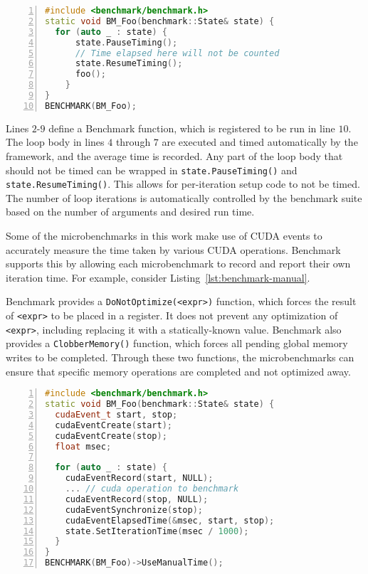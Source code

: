 \begin{minipage}{\linewidth}
\begin{lstlisting}[language=C++, caption=Benchmark with automatic timing., label=lst:benchmark-automatic, numbers=left]
#include <benchmark/benchmark.h>
static void BM_Foo(benchmark::State& state) {
  for (auto _ : state) {
	  state.PauseTiming();
	  // Time elapsed here will not be counted
	  state.ResumeTiming();
	  foo();
	}
}
BENCHMARK(BM_Foo);
\end{lstlisting}
\end{minipage}

Lines $2$-$9$ define a Benchmark function, which is registered to be run in line $10$.
The loop body in lines $4$ through $7$ are executed and timed automatically by the framework, and the average time is recorded.
Any part of the loop body that should not be timed can be wrapped in \texttt{state.PauseTiming()} and \texttt{state.ResumeTiming()}.
This allows for per-iteration setup code to not be timed.
The number of loop iterations is automatically controlled by the benchmark suite based on the number of arguments and desired run time.

Some of the microbenchmarks in this work make use of CUDA events to accurately measure the time taken by various CUDA operations.
Benchmark supports this by allowing each microbenchmark to record and report their own iteration time.
For example, consider Listing~\ref{lst:benchmark-manual}.

Benchmark provides a \texttt{DoNotOptimize(<expr>)} function, which forces the result of \texttt{<expr>} to be placed in a register.
It does not prevent any optimization of \texttt{<expr>}, including replacing it with a statically-known value.
Benchmark also provides a \texttt{ClobberMemory()} function, which forces all pending global memory writes to be completed.
Through these two functions, the microbenchmarks can ensure that specific memory operations are completed and not optimized away.

\begin{minipage}{\linewidth}
\begin{lstlisting}[language=C++, caption=Benchmark with manual timing., label=lst:benchmark-manual, numbers=left]
#include <benchmark/benchmark.h>
static void BM_Foo(benchmark::State& state) {
  cudaEvent_t start, stop;
  cudaEventCreate(start);
  cudaEventCreate(stop);
  float msec;

  for (auto _ : state) {
    cudaEventRecord(start, NULL);
    ... // cuda operation to benchmark
    cudaEventRecord(stop, NULL);
    cudaEventSynchronize(stop);
    cudaEventElapsedTime(&msec, start, stop);
    state.SetIterationTime(msec / 1000);
  }
}
BENCHMARK(BM_Foo)->UseManualTime();
\end{lstlisting}
\end{minipage}

